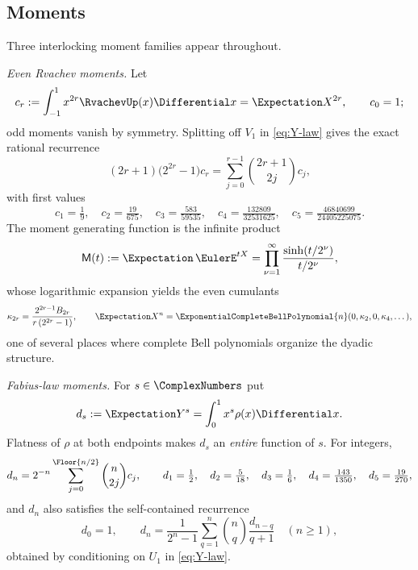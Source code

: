\subsection{Moments}
\label{sec:moments}

Three interlocking moment families appear throughout.

\emph{Even Rvachev moments.}  Let
\begin{equation}
 c_r:=\int_{-1}^{1}x^{2r}\RvachevUp(x)\Differential x=\Expectation X^{2r},
 \qquad c_0=1;
 \label{eq:c-def}
\end{equation}
odd moments vanish by symmetry.  Splitting off $V_1$ in
\eqref{eq:Y-law} gives the exact rational recurrence
\begin{equation}
 (2r+1)\bigl(2^{2r}-1\bigr)c_r
 =\sum_{j=0}^{r-1}\binom{2r+1}{2j}c_j,
 \label{eq:c-recurrence}
\end{equation}
with first values
\begin{equation}
 c_1=\tfrac19,\quad
 c_2=\tfrac{19}{675},\quad
 c_3=\tfrac{583}{59535},\quad
 c_4=\tfrac{132809}{32531625},\quad
 c_5=\tfrac{46840699}{24405225075}.
 \label{eq:c-values}
\end{equation}
The moment generating function is the infinite product
\begin{equation}
 \MM(t):=\Expectation\,\EulerE^{tX}
 =\prod_{\nu=1}^{\infty}\frac{\sinh(t/2^\nu)}{t/2^\nu},
 \label{eq:M-def}
\end{equation}
whose logarithmic expansion yields the even cumulants
\begin{equation}
 \kappa_{2r}=\frac{2^{2r-1}B_{2r}}{r\,(2^{2r}-1)},
 \qquad
 \Expectation X^{n}
 =\ExponentialCompleteBellPolynomial{n}(0,\kappa_2,0,\kappa_4,\dots),
 \label{eq:cumulants}
\end{equation}
one of several places where complete Bell polynomials organize the
dyadic structure.

\emph{Fabius-law moments.}  For $s\in\ComplexNumbers$ put
\begin{equation}
 d_s:=\Expectation Y^{s}=\int_0^1x^{s}\rho(x)\Differential x.
 \label{eq:d-def}
\end{equation}
Flatness of $\rho$ at both endpoints makes $d_s$ an \emph{entire}
function of $s$.  For integers,
\begin{equation}
 d_n=2^{-n}\sum_{j=0}^{\Floor{n/2}}\binom n{2j}c_j,
 \qquad
 d_1=\tfrac12,\quad d_2=\tfrac5{18},\quad d_3=\tfrac16,\quad
 d_4=\tfrac{143}{1350},\quad d_5=\tfrac{19}{270},
 \label{eq:d-from-c}
\end{equation}
and $d_n$ also satisfies the self-contained recurrence
\begin{equation}
 d_0=1,\qquad
 d_n=\frac{1}{2^{n}-1}
 \sum_{q=1}^{n}\binom nq\frac{d_{n-q}}{q+1}
 \quad(n\ge1),
 \label{eq:d-recurrence}
\end{equation}
obtained by conditioning on $U_1$ in \eqref{eq:Y-law}.

